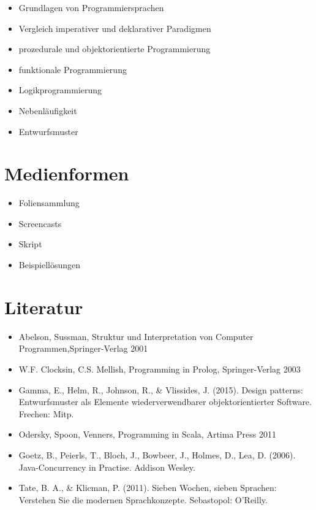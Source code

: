 \begin{itemize}
\tightlist
\item
  Grundlagen von Programmiersprachen
\item
  Vergleich imperativer und deklarativer Paradigmen
\item
  prozedurale und objektorientierte Programmierung
\item
  funktionale Programmierung
\item
  Logikprogrammierung
\item
  Nebenläufigkeit
\item
  Entwurfsmuster
\end{itemize}

\hypertarget{medienformenpathlabelmi-2017modulbeschreibungen-bachelorba_paradigmen-der-programmierung}{%
\section*{Medienformen\label{/mi-2017/modulbeschreibungen-bachelor/BA_Paradigmen-der-Programmierung}}\label{medienformenpathlabelmi-2017modulbeschreibungen-bachelorba_paradigmen-der-programmierung}}

\begin{itemize}
\tightlist
\item
  Foliensammlung
\item
  Screencasts
\item
  Skript
\item
  Beispiellösungen
\end{itemize}

\hypertarget{literaturpathlabelmi-2017modulbeschreibungen-bachelorba_paradigmen-der-programmierung}{%
\section*{Literatur\label{/mi-2017/modulbeschreibungen-bachelor/BA_Paradigmen-der-Programmierung}}\label{literaturpathlabelmi-2017modulbeschreibungen-bachelorba_paradigmen-der-programmierung}}

\begin{itemize}
\tightlist
\item
  Abelson, Sussman, Struktur und Interpretation von Computer
  Programmen,Springer-Verlag 2001
\item
  W.F. Clocksin, C.S. Mellish, Programming in Prolog, Springer-Verlag
  2003
\item
  Gamma, E., Helm, R., Johnson, R., \& Vlissides, J. (2015). Design
  patterns: Entwurfsmuster als Elemente wiederverwendbarer
  objektorientierter Software. Frechen: Mitp.
\item
  Odersky, Spoon, Venners, Programming in Scala, Artima Press 2011
\item
  Goetz, B., Peierls, T., Bloch, J., Bowbeer, J., Holmes, D., Lea, D.
  (2006). Java-Concurrency in Practise. Addison Wesley.
\item
  Tate, B. A., \& Klicman, P. (2011). Sieben Wochen, sieben Sprachen:
  Verstehen Sie die modernen Sprachkonzepte. Sebastopol: O'Reilly.
\end{itemize}

